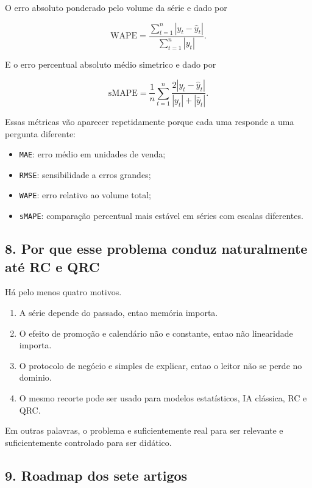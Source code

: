 \documentclass[12pt]{article}
\providecommand{\tightlist}{%
          \setlength{\itemsep}{0pt}\setlength{\parskip}{0pt}}
\begin{document}
O erro absoluto ponderado pelo volume da série e dado por

\[
\mathrm{WAPE} = \frac{\sum_{t=1}^n |y_t - \hat{y}_t|}{\sum_{t=1}^n |y_t|}.
\]

E o erro percentual absoluto médio simetrico e dado por

\[
\mathrm{sMAPE} = \frac{1}{n} \sum_{t=1}^n
\frac{2 |y_t - \hat{y}_t|}{|y_t| + |\hat{y}_t|}.
\]

Essas métricas vão aparecer repetidamente porque cada uma responde a uma pergunta diferente:

\begin{itemize}
\tightlist
\item
  \texttt{MAE}: erro médio em unidades de venda;
\item
  \texttt{RMSE}: sensibilidade a erros grandes;
\item
  \texttt{WAPE}: erro relativo ao volume total;
\item
  \texttt{sMAPE}: comparação percentual mais estável em séries com escalas diferentes.
\end{itemize}

\subsection{8. Por que esse problema conduz naturalmente até RC e QRC}\label{8-por-que-esse-problema-conduz-naturalmente-atuxe9-rc-e-qrc}

Há pelo menos quatro motivos.

\begin{enumerate}
\def\labelenumi{\arabic{enumi}.}
\tightlist
\item
  A série depende do passado, entao memória importa.
\item
  O efeito de promoção e calendário não e constante, entao não linearidade importa.
\item
  O protocolo de negócio e simples de explicar, entao o leitor não se perde no dominio.
\item
  O mesmo recorte pode ser usado para modelos estatísticos, IA clássica, RC e QRC.
\end{enumerate}

Em outras palavras, o problema e suficientemente real para ser relevante e suficientemente controlado para ser didático.

\subsection{9. Roadmap dos sete artigos}\label{9-roadmap-dos-sete-artigos}
\end{document}
